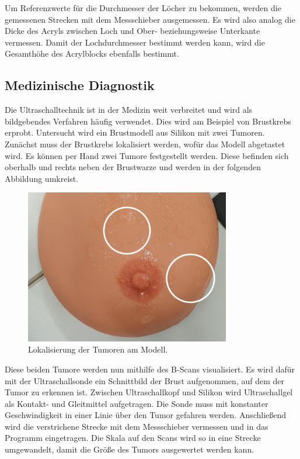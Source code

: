 \noindent Um Referenzwerte für die Durchmesser der Löcher zu bekommen, werden die gemessenen Strecken 
mit dem Messschieber ausgemessen. Es wird also analog die Dicke des Acryls zwischen Loch und Ober- 
beziehungsweise Unterkante vermessen. Damit der Lochdurchmesser bestimmt werden kann, wird die 
Gesamthöhe des Acrylblocks ebenfalls bestimmt. 


\subsection{Medizinische Diagnostik}
Die Ultraschalltechnik ist in der Medizin weit verbreitet und wird als bildgebendes Verfahren häufig 
verwendet. Dies wird am Beispiel von Brustkrebs erprobt. Untersucht wird ein Brustmodell aus Silikon 
mit zwei Tumoren. Zunächst muss der Brustkrebs lokalisiert werden, wofür das Modell abgetastet wird. 
Es können per Hand zwei Tumore festgestellt werden. Diese befinden sich oberhalb und rechts neben 
der Brustwarze und werden in der folgenden Abbildung umkreist. 

\begin{figure}[H]
    \centering
    \includegraphics[width = 0.8\textwidth]{Tumororientierung2.jpg}
    \caption{Lokalisierung der Tumoren am Modell.}
\end{figure}
 
\noindent Diese beiden Tumore werden nun mithilfe des B-Scans visualisiert. Es wird dafür mit der 
Ultraschallsonde ein Schnittbild der Brust aufgenommen, auf dem der Tumor zu erkennen ist. Zwischen 
Ultraschallkopf und Silikon wird Ultraschallgel als Kontakt- und Gleitmittel aufgetragen. Die Sonde 
muss mit konstanter Geschwindigkeit in einer Linie über den Tumor gefahren werden. Anschließend wird 
die verstrichene Strecke mit dem Messschieber vermessen und in das Programm eingetragen. Die Skala 
auf den Scans wird so in eine Strecke umgewandelt, damit die Größe des Tumors ausgewertet werden kann.






